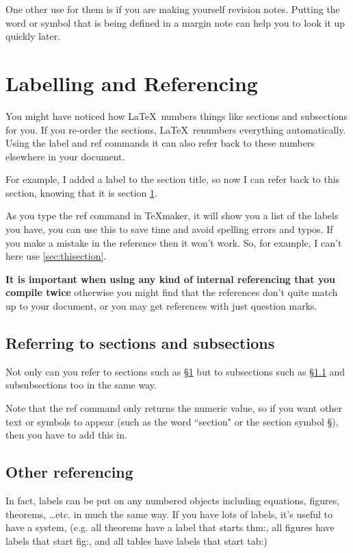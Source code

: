 \documentclass[a4paper,11pt]{article}
\begin{document}
One other use for them is if you are making yourself revision notes. Putting the word or symbol that is being defined in a margin note can help you to look it up quickly later.


\pagebreak


\section{Labelling and Referencing}\label{sec:thissection}

You might have noticed how \LaTeX\, numbers things like sections and subsections for you. If you re-order the sections, \LaTeX\, renumbers everything automatically. Using the label and ref commands it can also refer back to these numbers elsewhere in your document.

For example, I added a label to the section title, so now I can refer back to this section, knowing that it is section \ref{sec:thissection}.

As you type the ref command in TeXmaker, it will show you a list of the labels you have, you can use this to save time and avoid spelling errors and typos. If you make a mistake in the reference then it won't work. So, for example, I can't here use \ref{sec:thisection}. %

\textbf{It is important when using any kind of internal referencing that you compile twice} otherwise you might find that the references don't quite match up to your document, or you may get references with just question marks.


\subsection{Referring to sections and subsections}\label{subsec:thisSUBsection}

Not only can you refer to sections such as \S\ref{sec:thissection} but to subsections such as  \S\ref{subsec:thisSUBsection} and subsubsections too in the same way.

Note that the ref command only returns the numeric value, so if you want other text or symbols to appear (such as the word ``section" or the section symbol \S), then you have to add this in.

\subsection{Other referencing}

In fact, labels can be put on any numbered objects including equations,  figures, theorems, \dots etc. in much the same way. If you have lots of labels, it's useful to have a system, (e.g. all theorems have a label that starts thm:, all figures have labels that start fig:, and all tables have labels that start tab:)
\end{document}
